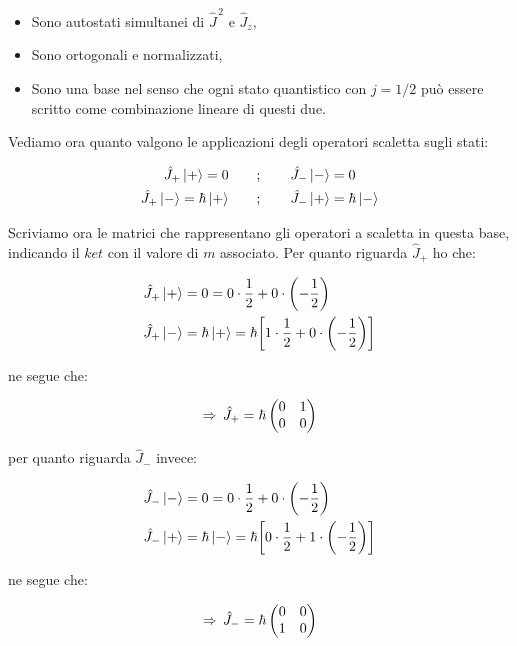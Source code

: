\begin{itemize}
	\begin{itemize}
		\item Sono autostati simultanei di $\hat{J}^{\, 2}$ e $\hat{J}_z$,
		\item Sono ortogonali e normalizzati,
		\item Sono una base nel senso che ogni stato quantistico con $j = 1/2 $ può essere scritto come combinazione lineare di questi due.
	\end{itemize}
	
		Vediamo ora quanto valgono le applicazioni degli operatori scaletta sugli stati:
	
	\begin{align*}
		\hat{J}_+ \ket{+} = 0 \qquad &; \qquad \hat{J}_- \ket{-} = 0 \\
		\hat{J}_+ \ket{-} = \hbar \ket{+} \qquad &; \qquad \hat{J}_- \ket{+} = \hbar \ket{-}
	\end{align*}
		
		Scriviamo ora le matrici che rappresentano gli operatori a scaletta in questa base, indicando il $ket$ con il valore di $m$ associato. Per quanto riguarda $\hat{J}_+$ ho che:
	
	\begin{align*}
		& \hat{J}_+ \ket{+} = 0 = 0 \cdot \frac{1}{2} + 0 \cdot \qty( - \frac{1}{2}) \\
		& \hat{J}_+ \ket{-} = \hbar \ket{+} = \hbar \qty[ 1 \cdot \frac{1}{2} + 0 \cdot \qty(- \frac{1}{2})  ] 
	\end{align*}
	
		ne segue che:
		
	\begin{align*}
		\Rightarrow \, \hat{J}_+ = \hbar \, \mqty( 0 & 1 \\ 0 & 0 )
	\end{align*}
	
		per quanto riguarda $\hat{J}_-$ invece:
	
	\begin{align*}
		& \hat{J}_- \ket{-} = 0 = 0 \cdot \frac{1}{2} + 0 \cdot \qty( - \frac{1}{2}) \\
		& \hat{J}_- \ket{+} = \hbar \ket{-} = \hbar \qty[ 0 \cdot \frac{1}{2} + 1 \cdot \qty(- \frac{1}{2})  ] 
	\end{align*}
	
		ne segue che:
		
	\begin{align*}
		\Rightarrow \, \hat{J}_- = \hbar \, \mqty( 0 & 0 \\ 1 & 0 )
	\end{align*}
	

\end{itemize}
